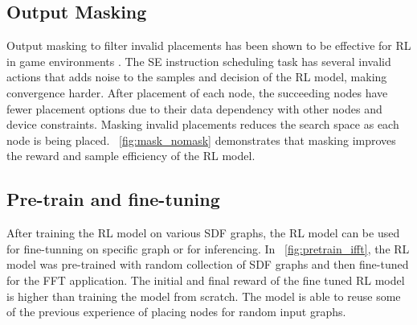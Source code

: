\subsection{Output Masking}
\label{subsec:output_masking}
Output masking to filter invalid placements has been shown to be effective for RL in game environments \cite{Shengyi_mask}. 
The SE instruction scheduling task has several invalid actions that adds noise to the samples and decision of the RL model, making convergence harder. 
After placement of each node, the succeeding nodes have fewer placement options due to their data dependency with other nodes and device constraints.
Masking invalid placements reduces the search space as each node is being placed. 
\figurename~\ref{fig:mask_nomask} demonstrates that masking improves the reward and sample efficiency of the RL model.

\subsection{Pre-train and fine-tuning}

After training the RL model on various SDF graphs, the RL model can be used for fine-tunning on specific graph or for inferencing.
In \figurename~\ref{fig:pretrain_ifft}, the RL model was pre-trained with random collection of SDF graphs and then fine-tuned for the FFT application.
The initial and final reward of the fine tuned RL model is higher than training the model from scratch.
The model is able to reuse some of the previous experience of placing nodes for random input graphs.
